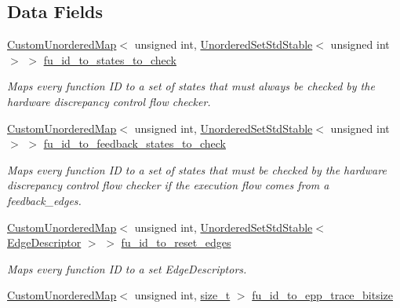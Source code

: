 \subsection*{Data Fields}
\begin{DoxyCompactItemize}
\item 
\hyperlink{custom__map_8hpp_ad1ed68f2ff093683ab1a33522b144adc}{Custom\+Unordered\+Map}$<$ unsigned int, \hyperlink{custom__set_8hpp_a1f63d303cef2790dc0a0ff7feae38f83}{Unordered\+Set\+Std\+Stable}$<$ unsigned int $>$ $>$ \hyperlink{structHWDiscrepancyInfo_a094b1af848ebfd6303824a42c9a32667}{fu\+\_\+id\+\_\+to\+\_\+states\+\_\+to\+\_\+check}
\begin{DoxyCompactList}\small\item\em Maps every function ID to a set of states that must always be checked by the hardware discrepancy control flow checker. \end{DoxyCompactList}\item 
\hyperlink{custom__map_8hpp_ad1ed68f2ff093683ab1a33522b144adc}{Custom\+Unordered\+Map}$<$ unsigned int, \hyperlink{custom__set_8hpp_a1f63d303cef2790dc0a0ff7feae38f83}{Unordered\+Set\+Std\+Stable}$<$ unsigned int $>$ $>$ \hyperlink{structHWDiscrepancyInfo_a7007e3390d5722c68c99964ea99a845b}{fu\+\_\+id\+\_\+to\+\_\+feedback\+\_\+states\+\_\+to\+\_\+check}
\begin{DoxyCompactList}\small\item\em Maps every function ID to a set of states that must be checked by the hardware discrepancy control flow checker if the execution flow comes from a feedback\+\_\+edges. \end{DoxyCompactList}\item 
\hyperlink{custom__map_8hpp_ad1ed68f2ff093683ab1a33522b144adc}{Custom\+Unordered\+Map}$<$ unsigned int, \hyperlink{custom__set_8hpp_a1f63d303cef2790dc0a0ff7feae38f83}{Unordered\+Set\+Std\+Stable}$<$ \hyperlink{graph_8hpp_a9eb9afea34e09f484b21f2efd263dd48}{Edge\+Descriptor} $>$ $>$ \hyperlink{structHWDiscrepancyInfo_a0e2c562ae790d5f14cf7ce2a9a8bfd88}{fu\+\_\+id\+\_\+to\+\_\+reset\+\_\+edges}
\begin{DoxyCompactList}\small\item\em Maps every function ID to a set Edge\+Descriptors. \end{DoxyCompactList}\item 
\hyperlink{custom__map_8hpp_ad1ed68f2ff093683ab1a33522b144adc}{Custom\+Unordered\+Map}$<$ unsigned int, \hyperlink{tutorial__fpt__2017_2intro_2sixth_2test_8c_a7c94ea6f8948649f8d181ae55911eeaf}{size\+\_\+t} $>$ \hyperlink{structHWDiscrepancyInfo_a0fd896762ccd15ce8051101f9cad3469}{fu\+\_\+id\+\_\+to\+\_\+epp\+\_\+trace\+\_\+bitsize}

\end{DoxyCompactItemize}
